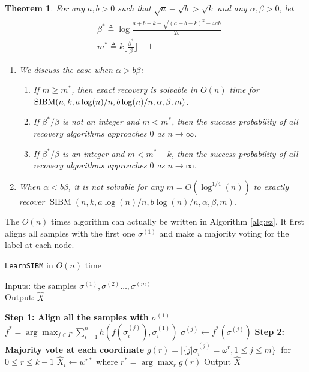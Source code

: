 \documentclass[conference]{IEEEtran}
\newtheorem{theorem}{Theorem}%
\DeclareMathOperator{\SIBM}{SIBM}
\begin{document}
\begin{theorem} \label{thm:wt1}
For any $a,b> 0$ such that $\sqrt{a}-\sqrt{b}> \sqrt{k}$ and any $\alpha,\beta>0$, let
\begin{align} \label{eq:defstar}
&\beta^\ast \triangleq
\log\frac{a+b-k-\sqrt{(a+b-k)^2-4ab}}{2 b}  \\
&m^\ast \triangleq k \Big\lfloor \frac{\beta^\ast}{\beta} \Big\rfloor +1 
\end{align}
\begin{enumerate}
	\item We discuss the case when $\alpha > b \beta$:
	\begin{enumerate}
	\item If $m\ge m^\ast$, then exact recovery is solvable in $O(n)$ time for $\SIBM(n,k, a\log(n)/n, \linebreak[4] b\log(n)/n,\alpha,\beta,m)$.
	\item If $\beta^\ast/\beta$ is not an integer and $m < m^\ast$, then the success probability of all recovery algorithms approaches $0$ as $n\to\infty$.
	\item If $\beta^\ast/\beta$ is an integer and $m < m^\ast - k$, then the success probability of all recovery algorithms approaches $0$ as $n\to\infty$.
	\end{enumerate}
	\item When $\alpha < b \beta$, it is not solvable for any $m=O(\log^{1/4}(n))$ to exactly recover $\SIBM(n,k, a\log(n)/n, b\log(n)/n,\alpha,\beta,m)$.
\end{enumerate}

\end{theorem}
The $O(n)$ times algorithm can actually be written in Algorithm \ref{alg:ez}. It first aligns all samples with the first one $\sigma^{(1)}$ and
make a majority voting for the label at each node.
\begin{algorithm}
	\caption{\texttt{LearnSIBM} in $O(n)$ time} \label{alg:ez}
	Inputs: the samples $\sigma^{(1)},\sigma^{(2)}\dots,\sigma^{(m)}$ \\
	Output: $\hat{X}$
	\begin{algorithmic}[1]
		\Statex 
		{\bf Step 1: Align all the samples with $\sigma^{(1)}$ }
		\State $f^* = \arg\max_{f \in \Gamma} \sum_{i=1}^n h(f(\sigma^{(j)}_i), \sigma^{(1)}_i)$
		\State $\sigma^{(j)} \gets f^*(\sigma^{(j)})$
		\EndFor
		\Statex
		{\bf Step 2: Majority vote at each coordinate}
		\State $g(r) = |\{j | \sigma^{(j)}_i = \omega^r,1\leq j \leq m\}|$  for $ 0 \leq r \leq k-1$
		\State $\hat{X}_i \gets w^{r*}$ where $r^*=\arg\max_r g(r)$
		\State{}
		\EndFor
		\State Output $\hat{X}$
	\end{algorithmic}
\end{algorithm}
\end{document}
